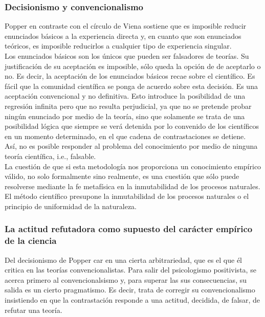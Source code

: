 \documentclass[a4paper, 11pt, twocolumn, spanish]{article}
\begin{document}
\subsubsection{Decisionismo y convencionalismo}
\label{sec:org799906b}
Popper en contraste con el círculo de Viena sostiene que es imposible
reducir enunciados básicos a la experiencia directa y, en cuanto que
son enunciados teóricos, es imposible reducirlos a cualquier tipo de
experiencia singular.\\[0pt]

Los enunciados básicos son los únicos que pueden ser falsadores de
teorías. Su justificación de su aceptación es imposible, sólo queda la
opción de de aceptarlo o no. Es decir, la aceptación de los enunciados
básicos recae sobre el científico. Es fácil que la comunidad
científica se ponga de acuerdo sobre esta decisión. Es una aceptación
convencional y no definitiva. Esto introduce la posibilidad de una
regresión infinita pero que no resulta perjudicial, ya que no se
pretende probar ningún enunciado por medio de la teoría, sino que
solamente se trata de una posibilidad lógica que siempre se verá
detenida por lo convenido de los científicos en un momento
determinado, en el que cadena de contrastaciones se detiene.\\[0pt]

Así, no es posible responder al problema del conocimiento por medio de
ninguna teoría científica, i.e., falsable.\\[0pt]
La cuestión de que si esta metodología nos proporciona un conocimiento
empírico válido, no solo formalmente sino realmente, es una cuestión
que sólo puede resolverse mediante la fe metafísica en la
inmutabilidad de los procesos naturales. El método científico
presupone la inmutabilidad de los procesos naturales o el principio de
uniformidad de la naturaleza.

\subsubsection{La actitud refutadora como supuesto del carácter empírico de la ciencia}
\label{sec:org6ea1c3f}
Del decisionismo de Popper car en una cierta arbitrariedad, que es el
que él critica en las teorías convencionalistas. Para salir del
psicologismo positivista, se acerca primero al convencionalsismo y,
para superar las sus consecuencias, su salida es un cierto
pragmatismo. Es decir, trata de corregir su convencionalismo
insistiendo en que la contrastación responde a una actitud, decidida,
de falsar, de refutar una teoría.
\end{document}
